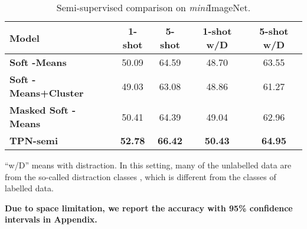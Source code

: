 \documentclass{article} \usepackage{iclr2019_conference,times}
\def\mini{{\textit{mini}ImageNet}}
\begin{document}
\begin{table}[ht]
\centering
\begin{threeparttable}
\small
\caption{Semi-supervised comparison on \mini.}
\label{semi-mini}
\begin{tabular}{lcccc}
\hline
Model   & \multicolumn{1}{c}{1-shot} & \multicolumn{1}{c}{5-shot} & \multicolumn{1}{c}{1-shot w/D} & \multicolumn{1}{c}{5-shot w/D} \\ \hline
\textbf{Soft -Means~\citep{semi-proto}}          & 50.09 & 64.59 & 48.70 & 63.55 \\
\textbf{Soft -Means+Cluster~\citep{semi-proto}}  & 49.03 & 63.08 & 48.86 & 61.27 \\
\textbf{Masked Soft -Means~\citep{semi-proto}}   & 50.41 & 64.39 & 49.04 & 62.96 \\ \hline
\textbf{TPN-semi}                                   & \textbf{52.78} & \textbf{66.42} & \textbf{50.43} & \textbf{64.95}\\ \hline
\end{tabular}
\begin{tablenotes}
  	\item * ``w/D'' means with distraction. In this setting, many of the unlabelled data are from the so-called distraction classes , which is different from the classes of labelled data.
  	\item  \textbf{Due to space limitation, we report the accuracy with 95\% confidence intervals in Appendix.}
\end{tablenotes} 
\end{threeparttable}
\end{table}
\end{document}
